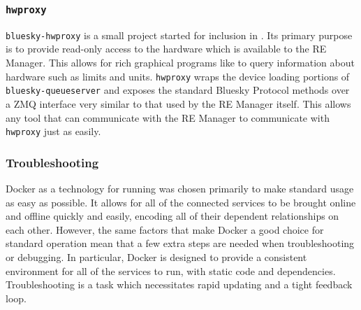 \subsubsection{\texttt{hwproxy}}

\texttt{bluesky-hwproxy}\cite{} is a small project started for inclusion in \biab.
Its primary purpose is to provide read-only access to the hardware which is available to the RE Manager.
This allows for rich graphical programs like \blueskycmds to query information about hardware such as limits and units.
\texttt{hwproxy} wraps the device loading portions of \texttt{bluesky-queueserver} and exposes the standard Bluesky Protocol methods over a ZMQ interface very similar to that used by the RE Manager itself.
This allows any tool that can communicate with the RE Manager to communicate with \texttt{hwproxy} just as easily.

\subsubsection{Troubleshooting}

Docker as a technology for running \biab was chosen primarily to make standard usage as easy as possible.
It allows for all of the connected services to be brought online and offline quickly and easily, encoding all of their dependent relationships on each other.
However, the same factors that make Docker a good choice for standard operation mean that a few extra steps are needed when troubleshooting or debugging.
In particular, Docker is designed to provide a consistent environment for all of the services to run, with static code and dependencies.
Troubleshooting is a task which necessitates rapid updating and a tight feedback loop.


